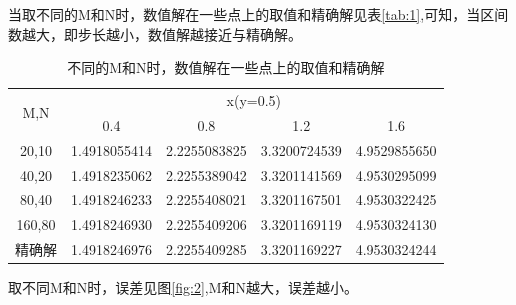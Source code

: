 \documentclass[withoutpreface,bwprint]{cumcmthesis} %
\begin{document}
	当取不同的M和N时，数值解在一些点上的取值和精确解见表\ref{tab:1},可知，当区间数越大，即步长越小，数值解越接近与精确解。
	\begin{table}[htbp]
		\centering
		\caption{不同的M和N时，数值解在一些点上的取值和精确解}
		\begin{tabular}{crrrr}
			\multirow{2}[0]{*}{M,N} & \multicolumn{4}{c}{x(y=0.5)} \\
			& \multicolumn{1}{c}{0.4} & \multicolumn{1}{c}{0.8} & \multicolumn{1}{c}{1.2} & \multicolumn{1}{c}{1.6} \\
			20,10 & 1.4918055414  & 2.2255083825  & 3.3200724539  & 4.9529855650  \\
			40,20 & 1.4918235062  & 2.2255389042  & 3.3201141569  & 4.9530295099  \\
			80,40 & 1.4918246233  & 2.2255408021  & 3.3201167501  & 4.9530322425  \\
			160,80 & 1.4918246930  & 2.2255409206  & 3.3201169119  & 4.9530324130  \\
			精确解   & 1.4918246976  & 2.2255409285  & 3.3201169227  & 4.9530324244  \\
		\end{tabular}%
		\label{tab:addlabel}%
	\end{table}%
	
	
	
	取不同M和N时，误差见图\ref{fig:2},M和N越大，误差越小。
	
\end{document}
